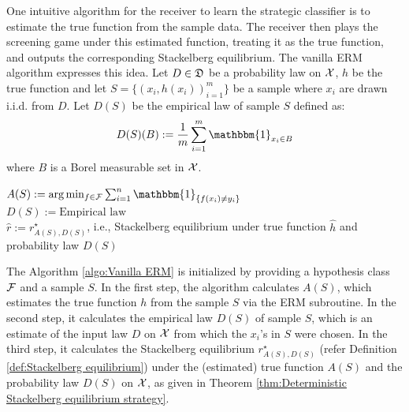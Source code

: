 One intuitive algorithm for the receiver to learn the strategic classifier is to estimate the true function from the sample data. The receiver then plays the screening game under this estimated function, treating it as the true function, and outputs the corresponding Stackelberg equilibrium. The vanilla ERM algorithm expresses this idea.
Let $D \in \mathfrak{D}$ be a probability law on $\mathcal{X}$, $h$ be the true function and let $S = \{(x_i, h(x_i))_{i=1}^m\}$ be a sample where $x_i$ are drawn i.i.d. from $D$. Let $D(S)$ be the empirical law of sample $S$ defined as:
\begin{equation}\label{eqn:empirical measure}
D(S)(B) := \frac{1}{m}\sum_{i=1}^m \mathbbm{1}_{x_i \in B}  
\end{equation}
where $B$ is a Borel measurable set in $\mathcal{X}$. 

\begin{center}
	\begin{algorithm}[H]\label{algo:Vanilla ERM}
		\SetAlgoLined
		\DontPrintSemicolon
		
		\BlankLine
		$A(S) := \arg\min_{f \in \cg{F}} \sum_{i=1}^n \mathbbm{1}_{\{f(x_i) \neq y_i\}}$\\
		$D(S) :=\text{Empirical law }$ \\
		\BlankLine
		$\hat{r} := r^\star_{A(S),D(S)}$, i.e., Stackelberg equilibrium under true function $\hat{h}$ and probability law $D(S)$ \;
		\BlankLine
		\caption{Vanilla ERM algorithm}
	\end{algorithm}
\end{center}

The Algorithm \ref{algo:Vanilla ERM} is initialized by providing a hypothesis class $\mathcal{F}$ and a sample $S$. In the first step, the algorithm calculates $A(S)$, which estimates the true function $h$ from the sample $S$ via the ERM subroutine. In the second step, it calculates the empirical law $D(S)$ of sample $S$, which is an estimate of the input law $D$ on $\mathcal{X}$ from which the $x_i$'s in $S$ were chosen. In the third step, it calculates the Stackelberg equilibrium $r^\star_{A(S),D(S)}$ (refer Definition \ref{def:Stackelberg equilibrium}) under the (estimated) true function $A(S)$ and the probability law $D(S)$ on $\mathcal{X}$, as given in Theorem \ref{thm:Deterministic Stackelberg equilibrium strategy}. 

